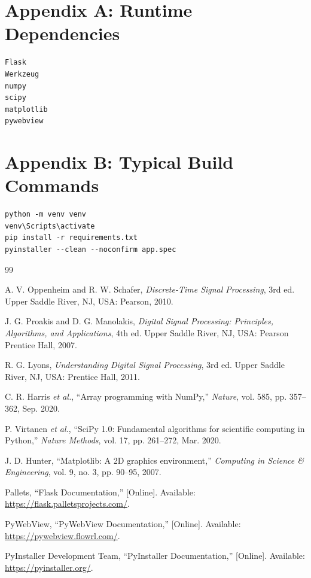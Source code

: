 \documentclass[conference]{IEEEtran}
\begin{document}
\section*{Appendix A: Runtime Dependencies}
\begin{lstlisting}[style=pythonstyle]
Flask
Werkzeug
numpy
scipy
matplotlib
pywebview
\end{lstlisting}

\section*{Appendix B: Typical Build Commands}
\begin{lstlisting}[style=pythonstyle]
python -m venv venv
venv\Scripts\activate
pip install -r requirements.txt
pyinstaller --clean --noconfirm app.spec
\end{lstlisting}

\begin{thebibliography}{99}

A. V. Oppenheim and R. W. Schafer, \textit{Discrete-Time Signal Processing}, 3rd ed. Upper Saddle River, NJ, USA: Pearson, 2010.

J. G. Proakis and D. G. Manolakis, \textit{Digital Signal Processing: Principles, Algorithms, and Applications}, 4th ed. Upper Saddle River, NJ, USA: Pearson Prentice Hall, 2007.

R. G. Lyons, \textit{Understanding Digital Signal Processing}, 3rd ed. Upper Saddle River, NJ, USA: Prentice Hall, 2011.

C. R. Harris \textit{et al.}, ``Array programming with NumPy,'' \textit{Nature}, vol. 585, pp. 357--362, Sep. 2020.

P. Virtanen \textit{et al.}, ``SciPy 1.0: Fundamental algorithms for scientific computing in Python,'' \textit{Nature Methods}, vol. 17, pp. 261--272, Mar. 2020.

J. D. Hunter, ``Matplotlib: A 2D graphics environment,'' \textit{Computing in Science \& Engineering}, vol. 9, no. 3, pp. 90--95, 2007.

Pallets, ``Flask Documentation,'' [Online]. Available: \url{https://flask.palletsprojects.com/}.

PyWebView, ``PyWebView Documentation,'' [Online]. Available: \url{https://pywebview.flowrl.com/}.

PyInstaller Development Team, ``PyInstaller Documentation,'' [Online]. Available: \url{https://pyinstaller.org/}.

\end{thebibliography}
\end{document}

